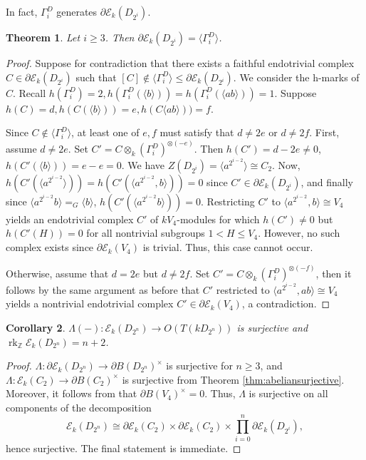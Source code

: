 \documentclass[10pt,letterpaper, boxed, cm]{amsart}
\newcommand{\Z}{\mathbb{Z}}
\newcommand{\rk}{\operatorname{rk}}
\newcommand{\calE}{\mathcal{E}}
\newtheorem{theorem}{Theorem}[section]
\newtheorem{corollary}[theorem]{Corollary}
\theoremstyle{remark}
\theoremstyle{definition}
\begin{document}
	In fact, $\Gamma^D_i$ generates $\partial\calE_k(D_{2^i})$.

	\begin{theorem}
		Let $i \geq 3$. Then $\partial\calE_k(D_{2^i}) = \langle \Gamma^D_i\rangle$.
	\end{theorem}
	\begin{proof}
		Suppose for contradiction that there exists a faithful endotrivial complex $C \in \partial\calE_k(D_{2^i})$ such that $[C] \not\in \langle\Gamma^D_i\rangle  \leq \partial \calE_k(D_{2^i})$. We consider the h-marks of $C$. Recall $h(\Gamma^D_i) = 2, h(\Gamma^D_i(\langle b\rangle)) = h(\Gamma^D_i(\langle ab \rangle)) = 1.$ Suppose $h(C) = d, h(C(\langle b \rangle)) = e, h(C\langle ab\rangle)) = f$.

		Since $C \not\in  \langle\Gamma^D_i\rangle$, at least one of $e,f$ must satisfy that $d \neq 2e$ or $d \neq 2f$. First, assume $d \neq 2e$. Set $C' = C\otimes_k (\Gamma^D_i)^{\otimes (-e)}$. Then $h(C') = d-2e \neq 0$, $h(C'(\langle b \rangle)) = e-e= 0$. We have $Z(D_{2^i}) = \langle a^{2^{i-2}} \rangle \cong C_2$. Now, $h(C'(\langle a^{2^{i-2}} \rangle)) = h(C'(\langle a^{2^{i-2}}, b \rangle)) = 0$ since $C' \in \partial\calE_k(D_{2^i})$, and finally since $\langle a^{2^{i-2}}b\rangle =_G \langle b \rangle$, $h(C'(\langle a^{2^{i-2}}b\rangle)) = 0$. Restricting $C'$ to $\langle a^{2^{i-2}},b \rangle \cong V_4$ yields an endotrivial complex $C'$ of $kV_4$-modules for which $h(C') \neq 0$ but $ h(C'(H)) = 0$ for all nontrivial subgroups $1 < H \leq V_4$. However, no such complex exists since $\partial \calE_k(V_4)$ is trivial. Thus, this case cannot occur.

		Otherwise, assume that $d = 2e$ but $d \neq 2f$. Set $C' = C\otimes_k (\Gamma^D_i)^{\otimes (-f)}$, then it follows by the same argument as before that $C'$ restricted to $\langle a^{2^{i-2}},ab \rangle \cong V_4$ yields a nontrivial endotrivial complex $C' \in \partial\calE_k(V_4)$, a contradiction.
	\end{proof}

	\begin{corollary}
		$\Lambda(-): \calE_k(D_{2^n}) \to O(T(kD_{2^n}))$ is surjective and $\rk_\Z\calE_k(D_{2^n}) = n+2$.
	\end{corollary}
	\begin{proof}
		$\Lambda: \partial\calE_k(D_{2^n}) \to \partial B(D_{2^n})^\times$ is surjective for $n \geq 3$, and $\Lambda: \calE_k(C_2) \to \partial B(C_2)^\times$ is surjective from Theorem \ref{thm:abeliansurjective}. Moreover, it follows from \cite[Example 4.5]{M83} that $\partial B(V_4)^\times = 0$. Thus, $\Lambda$ is surjective on all components of the decomposition \[\calE_k(D_{2^n})\cong \partial\calE_k(C_2)\times \partial\calE_k(C_2)\times \prod_{i=0}^n \partial\calE_k(D_{2^i}),\] hence surjective. The final statement is immediate.
	\end{proof}
\end{document}
